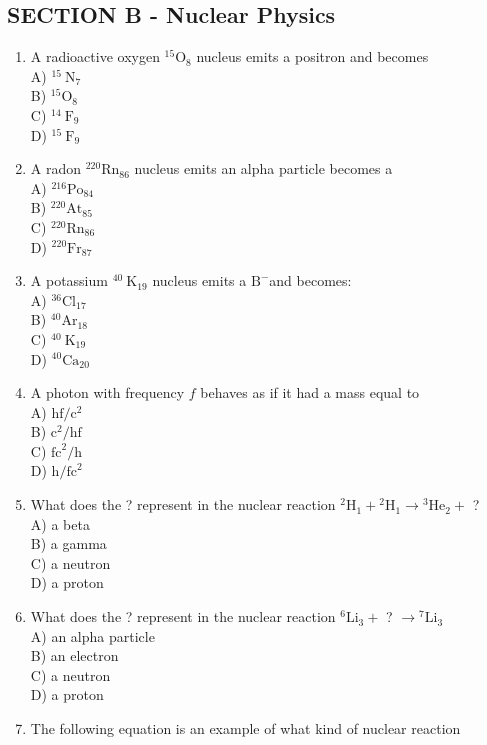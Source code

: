 \begin{enumerate}
\section*{SECTION B - Nuclear Physics}
\begin{enumerate}
  \item A radioactive oxygen ${ }^{15} \mathrm{O}_{8}$ nucleus emits a positron and becomes\\
A) ${ }^{15} \mathrm{~N}_{7}$\\
B) ${ }^{15} \mathrm{O}_{8}$\\
C) ${ }^{14} \mathrm{~F}_{9}$\\
D) ${ }^{15} \mathrm{~F}_{9}$
  \item A radon ${ }^{220} \mathrm{Rn}_{86}$ nucleus emits an alpha particle becomes a\\
A) ${ }^{216} \mathrm{Po}_{84}$\\
B) ${ }^{220} \mathrm{At}_{85}$\\
C) ${ }^{220} \mathrm{Rn}_{86}$\\
D) ${ }^{220} \mathrm{Fr}_{87}$
  \item A potassium ${ }^{40} \mathrm{~K}_{19}$ nucleus emits a $\mathrm{B}^{-}$and becomes:\\
A) ${ }^{36} \mathrm{Cl}_{17}$\\
B) ${ }^{40} \mathrm{Ar}_{18}$\\
C) ${ }^{40} \mathrm{~K}_{19}$\\
D) ${ }^{40} \mathrm{Ca}_{20}$
  \item A photon with frequency $f$ behaves as if it had a mass equal to\\
A) $\mathrm{hf} / \mathrm{c}^{2}$\\
B) $\mathrm{c}^{2} / \mathrm{hf}$\\
C) $\mathrm{fc}^{2} / \mathrm{h}$\\
D) $\mathrm{h} / \mathrm{fc}^{2}$
  \item What does the ? represent in the nuclear reaction ${ }^{2} \mathrm{H}_{1}+{ }^{2} \mathrm{H}_{1} \rightarrow{ }^{3} \mathrm{He}_{2}+$ ?\\
A) a beta\\
B) a gamma\\
C) a neutron\\
D) a proton
  \item What does the ? represent in the nuclear reaction ${ }^{6} \mathrm{Li}_{3}+$ ? $\rightarrow{ }^{7} \mathrm{Li}_{3}$\\
A) an alpha particle\\
B) an electron\\
C) a neutron\\
D) a proton
  \item The following equation is an example of what kind of nuclear reaction
\end{enumerate}


\end{enumerate}
